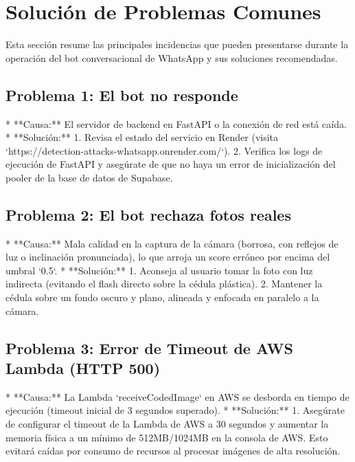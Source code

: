 \section{Solución de Problemas Comunes}
\label{sec:troubleshooting}

Esta sección resume las principales incidencias que pueden presentarse durante la operación del bot conversacional de WhatsApp y sus soluciones recomendadas.

\subsection{Problema 1: El bot no responde}
* **Causa:** El servidor de backend en FastAPI o la conexión de red está caída.
* **Solución:**
    1. Revisa el estado del servicio en Render (visita `https://detection-attacks-whatsapp.onrender.com/`).
    2. Verifica los logs de ejecución de FastAPI y asegúrate de que no haya un error de inicialización del pooler de la base de datos de Supabase.

\subsection{Problema 2: El bot rechaza fotos reales}
* **Causa:** Mala calidad en la captura de la cámara (borrosa, con reflejos de luz o inclinación pronunciada), lo que arroja un score erróneo por encima del umbral `0.5`.
* **Solución:**
    1. Aconseja al usuario tomar la foto con luz indirecta (evitando el flash directo sobre la cédula plástica).
    2. Mantener la cédula sobre un fondo oscuro y plano, alineada y enfocada en paralelo a la cámara.

\subsection{Problema 3: Error de Timeout de AWS Lambda (HTTP 500)}
* **Causa:** La Lambda `receiveCodedImage` en AWS se desborda en tiempo de ejecución (timeout inicial de 3 segundos superado).
* **Solución:**
    1. Asegúrate de configurar el timeout de la Lambda de AWS a 30 segundos y aumentar la memoria física a un mínimo de 512MB/1024MB en la consola de AWS. Esto evitará caídas por consumo de recursos al procesar imágenes de alta resolución.
